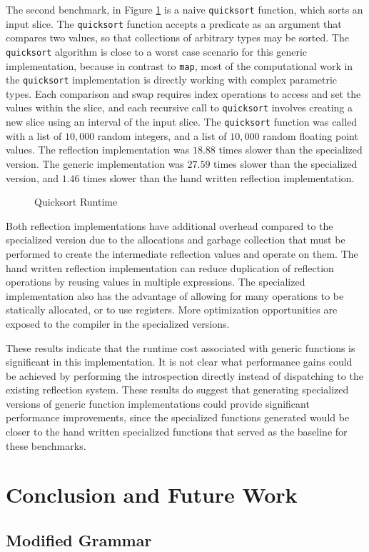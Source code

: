 \documentclass[letterpaper,twocolumn,11pt]{article}
\begin{document}
The second benchmark, in Figure \ref{fig:quicksort} is a naive \texttt{quicksort} function, which sorts an input slice. The \texttt{quicksort} function accepts a predicate as an argument that compares two values, so that collections of arbitrary types may be sorted. The \texttt{quicksort} algorithm is close to a worst case scenario for this generic implementation, because in contrast to \texttt{map}, most of the computational work in the \texttt{quicksort} implementation is directly working with complex parametric types. Each comparison and swap requires index operations to access and set the values within the slice, and each recursive call to \texttt{quicksort} involves creating a new slice using an interval of the input slice. The \texttt{quicksort} function was called with a list of $10,000$ random integers, and a list of $10,000$ random floating point values. The reflection implementation was $18.88$ times slower than the specialized version. The generic implementation was $27.59$ times slower than the specialized version, and $1.46$ times slower than the hand written reflection implementation.

\begin{figure}
    \caption{Quicksort Runtime\label{fig:quicksort}}
    \centering
    
\end{figure}

Both reflection implementations have additional overhead compared to the specialized version due to the allocations and garbage collection that must be performed to create the intermediate reflection values and operate on them. The hand written reflection implementation can reduce duplication of reflection operations by reusing values in multiple expressions. The specialized implementation also has the advantage of allowing for many operations to be statically allocated, or to use registers. More optimization opportunities are exposed to the compiler in the specialized versions.

These results indicate that the runtime cost associated with generic functions is significant in this implementation. It is not clear what performance gains could be achieved by performing the introspection directly instead of dispatching to the existing reflection system. These results do suggest that generating specialized versions of generic function implementations could provide significant performance improvements, since the specialized functions generated would be closer to the hand written specialized functions that served as the baseline for these benchmarks.

\section{Conclusion and Future Work} \label{conclusion}



{\footnotesize 
  }

\theendnotes


\begin{appendices}

\section{Modified Grammar} \label{App:grammar}

\end{appendices}
\end{document}

